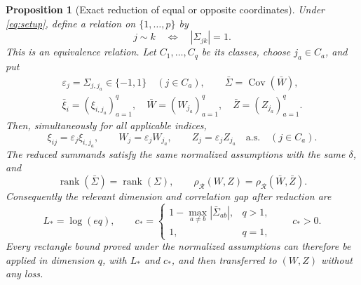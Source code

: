 \documentclass[11pt,a4paper]{article}
\newtheorem{proposition}{Proposition}
\theoremstyle{remark}
\newcommand{\Cov}{\operatorname{Cov}}
\newcommand{\rh}{\rho_{\mathcal R}}
\begin{document}
\begin{proposition}[Exact reduction of equal or opposite coordinates]
\label{red:coordinate-reduction}
Under \eqref{eq:setup}, define a relation on \(\{1,\ldots,p\}\) by
\[
 j\sim k\quad\Longleftrightarrow\quad |\Sigma_{jk}|=1.
\]
This is an equivalence relation.  Let \(C_1,\ldots,C_q\) be its classes,
choose \(j_a\in C_a\), and put
\[
 \begin{gathered}
 \varepsilon_j=\Sigma_{j,j_a}\in\{-1,1\}\quad(j\in C_a),
 \qquad \bar\Sigma=\Cov(\bar W),\\
 \bar\xi_i=(\xi_{i,j_a})_{a=1}^q,\quad
 \bar W=(W_{j_a})_{a=1}^q,\quad
 \bar Z=(Z_{j_a})_{a=1}^q.
 \end{gathered}
\]
Then, simultaneously for all applicable indices,
\begin{equation}
 \xi_{ij}=\varepsilon_j\xi_{i,j_a},\qquad
 W_j=\varepsilon_j W_{j_a},\qquad
 Z_j=\varepsilon_j Z_{j_a}
 \quad\text{a.s.}\quad(j\in C_a).
 \label{red:relations}
\end{equation}
The reduced summands satisfy the same normalized assumptions with the
same \(\delta\), and
\begin{equation}
 \operatorname{rank}(\bar\Sigma)=\operatorname{rank}(\Sigma),
 \qquad
 \rh(W,Z)=\rh(\bar W,\bar Z).
 \label{red:rank-distance}
\end{equation}
Consequently the relevant dimension and correlation gap after reduction
are
\begin{equation}
 L_* =\log(eq),\qquad
 c_*=
 \begin{cases}
  1-\displaystyle\max_{a\ne b}|\bar\Sigma_{ab}|,&q>1,\\[0.4em]
  1,&q=1,
 \end{cases}
 \qquad c_*>0.
 \label{red:parameters}
\end{equation}
Every rectangle bound proved under the normalized assumptions can
therefore be applied in dimension \(q\), with \(L_*\) and \(c_*\), and
then transferred to \((W,Z)\) without any loss.
\end{proposition}
\end{document}
